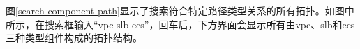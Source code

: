     

图\ref{search-component-path}显示了搜索符合特定路径类型关系的所有拓扑。如图中所示，在搜索框输入“vpc-slb-ecs”，回车后，下方界面会显示所有由vpc、slb和ecs三种类型组件构成的拓扑结构。

